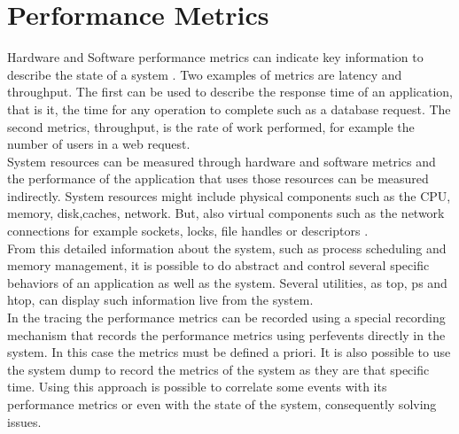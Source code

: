 \section{Performance Metrics}
Hardware and Software performance metrics can indicate key information to describe the state of a system \cite{brendan_book}. Two examples of metrics are latency and throughput. The first can be used to describe the response time of an application, that is it, the time for any operation to complete such as a database request. The second metrics, throughput, is the rate of work performed, for example the number of users in a web request.\\
System resources can be measured through hardware and software metrics and the performance of the application that uses those resources can be measured indirectly. System resources might include physical components such as the CPU, memory, disk,caches, network. But, also virtual components such as the network connections  for example sockets, locks, file handles or descriptors \cite{brendan_book}. \\
From this detailed information about the system, such as process scheduling and memory management, it is possible to do abstract and control several specific behaviors of an application as well as the system. Several utilities, as top, ps and htop, can display such information live from the system.\\
In the tracing the performance metrics can be recorded using a special recording mechanism that records the performance metrics using perf\textunderscore events directly in the system. In this case the metrics must be defined a priori. It is also possible to use the system dump to record the metrics of the system as they are that specific time. Using this approach is possible to correlate some events with its performance metrics or even with the state of the system, consequently solving issues.
